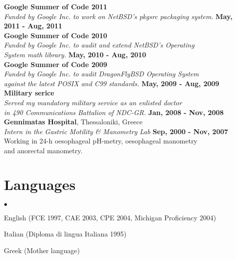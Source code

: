 \documentclass[margin,line]{res}
\newenvironment{list2}{
  \begin{list}{$\bullet$}{%
      \setlength{\itemsep}{0in}
      \setlength{\parsep}{0in} \setlength{\parskip}{0in}
      \setlength{\topsep}{0in} \setlength{\partopsep}{0in}
      \setlength{\leftmargin}{0.2in}}}{\end{list}}
\begin{document}
\begin{resume}
{\bf Google Summer of Code 2011}\\
{\em Funded by Google Inc. to work on NetBSD's pkgsrc packaging system.}
\hfill {\bf May, 2011 - Aug, 2011}\\

{\bf Google Summer of Code 2010}\\
{\em Funded by Google Inc. to audit and extend NetBSD's Operating\\ System math library.}
\hfill {\bf May, 2010 - Aug, 2010}\\

{\bf Google Summer of Code 2009}\\
{\em Funded by Google Inc. to audit DragonFlyBSD Operating System\\ against the latest POSIX and C99 standards.}
\hfill {\bf May, 2009 - Aug, 2009}\\

{\bf Military serice}\\
{\em Served my mandatory military service as an enlisted doctor\\in 490 Communications Battalion of NDC-GR.}
\hfill {\bf Jan, 2008 - Nov, 2008}\\

{\bf Gennimatas Hospital}, Thessaloniki, Greece\\
{\em Intern in the Gastric Motility \& Manometry Lab} \hfill {\bf Sep, 2000 - Nov, 2007}\\
Working in 24-h oesophageal pH-metry, oesophageal manometry\\
and anorectal manometry.

\section{\sc Languages}
\begin{list2}
\item English (FCE 1997, CAE 2003, CPE 2004, Michigan Proficiency 2004)
\item Italian (Diploma di lingua Italiana 1995)
\item Greek (Mother language)
\end{list2}


\end{resume}
\end{document}
